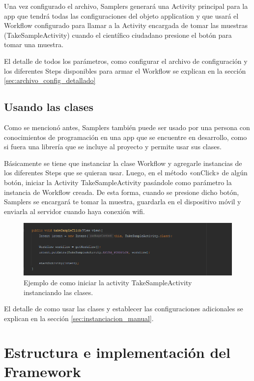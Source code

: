 Una vez configurado el archivo, Samplers generará una Activity principal para la app que tendrá todas las configuraciones del objeto application y que usará el Workflow configurado para llamar a la Activity encargada de tomar las muestras (TakeSampleActivity) cuando el científico ciudadano presione el botón para tomar una muestra.

El detalle de todos los parámetros, como configurar el archivo de configuración y los diferentes Steps disponibles para armar el Workflow se explican en la sección \ref{sec:archivo_config_detallado}


\subsection{Usando las clases} \label{sec:usando_las_clases}
Como se mencionó antes, Samplers también puede ser usado por una persona con conocimientos de programación en una app que se encuentre en desarrollo, como si fuera una librería que se incluye al proyecto y permite usar sus clases. 

Básicamente se tiene que instanciar la clase Workflow y agregarle instancias de los diferentes Steps que se quieran usar. Luego, en el método «onClick» de algún botón, iniciar la Activity TakeSampleActivity pasándole como parámetro la instancia de Workflow creada. De esta forma, cuando se presione dicho botón, Samplers se encargará te tomar la muestra, guardarla en el dispositivo móvil y enviarla al servidor cuando haya conexión wifi.

\begin{figure}[H]
  \centering
    \includegraphics[scale=0.6]{05-implementacion/take_sample_click.png} 
   \caption{Ejemplo de como iniciar la activity TakeSampleActivity instanciando las clases.}
\end{figure}	

El detalle de como usar las clases y establecer las configuraciones adicionales se explican en la sección \ref{sec:instanciacion_manual}.

\section{Estructura e implementación del Framework}

